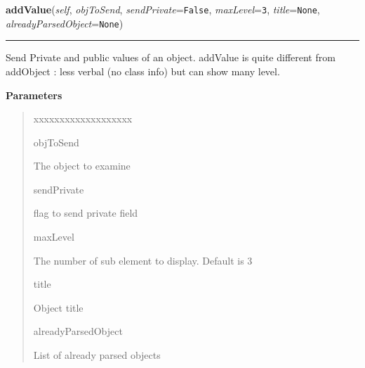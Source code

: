 \hspace{.8\funcindent}\begin{boxedminipage}{\funcwidth}

    \raggedright \textbf{addValue}(\textit{self}, \textit{objToSend}, \textit{sendPrivate}={\tt False}, \textit{maxLevel}={\tt 3}, \textit{title}={\tt None}, \textit{alreadyParsedObject}={\tt None})

    \vspace{-1.5ex}

    \rule{\textwidth}{0.5\fboxrule}
\setlength{\parskip}{2ex}
    Send Private and public values of an object. addValue is quite 
    different from addObject : less verbal (no class info) but can show 
    many level.

\setlength{\parskip}{1ex}
      \textbf{Parameters}
      \vspace{-1ex}

      \begin{quote}
        \begin{Ventry}{xxxxxxxxxxxxxxxxxxx}

          \item[objToSend]

          The object to examine

          \item[sendPrivate]

          flag to send private field

          \item[maxLevel]

          The number of sub element to display. Default is 3

          \item[title]

          Object title

          \item[alreadyParsedObject]

          List of already parsed objects

        \end{Ventry}

      \end{quote}

    \end{boxedminipage}

    \label{tracetool:TraceNodeEx:addTable}

    \vspace{0.5ex}


